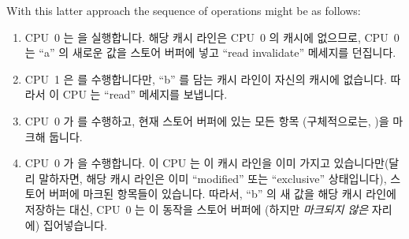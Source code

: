 With this latter approach the sequence of operations might be as follows:
\fi
\begin{enumerate}
\item	CPU~0 는  을 실행합니다.
	해당 캐시 라인은 CPU~0 의 캐시에 없으므로, CPU~0 는 ``a'' 의 새로운
	값을 스토어 버퍼에 넣고 ``read invalidate'' 메세지를 던집니다.
\item	CPU~1 은  를 수행합니다만, ``b'' 를 담는
	캐시 라인이 자신의 캐시에 없습니다.
	따라서 이 CPU 는 ``read'' 메세지를 보냅니다.
\item	CPU~0 가  를 수행하고, 현재 스토어 버퍼에 있는 모든 항목
	(구체적으로는, )을 마크해 둡니다.
\item	CPU~0 가  을 수행합니다.
	이 CPU 는 이 캐시 라인을 이미 가지고 있습니다만(달리 말하자면, 해당
	캐시 라인은 이미 ``modified'' 또는 ``exclusive'' 상태입니다), 스토어
	버퍼에 마크된 항목들이 있습니다.
	따라서, ``b'' 의 새 값을 해당 캐시 라인에 저장하는 대신, CPU~0 는 이
	동작을 스토어 버퍼에 (하지만 \emph{마크되지 않은} 자리에) 집어넣습니다.
\iffalse


\end{enumerate}
